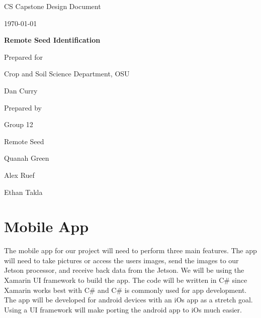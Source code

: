 \documentclass[onecolumn, draftclsnofoot,10pt, compsoc]{IEEEtran}
\def \CapstoneTeamName{		Remote Seed}
\def \CapstoneTeamNumber{		12}
\def \GroupMemberOne{			Quanah Green}
\def \GroupMemberTwo{			Alex Ruef}
\def \GroupMemberThree{			Ethan Takla}
\def \CapstoneProjectName{		Remote Seed Identification}
\def \CapstoneSponsorCompany{	Crop and Soil Science Department, OSU}
\def \CapstoneSponsorPerson{		Dan Curry}
\def \DocType{		%
				Design Document
				}
\newcommand{\NameSigPair}[1]{\par
\makebox[2.75in][r]{#1} \hfil 	\makebox[3.25in]{\makebox[2.25in]{\hrulefill} \hfill		\makebox[.75in]{\hrulefill}}
\par\vspace{-12pt} \textit{\tiny\noindent
\makebox[2.75in]{} \hfil		\makebox[3.25in]{\makebox[2.25in][r]{Signature} \hfill	\makebox[.75in][r]{Date}}}}
\renewcommand{\NameSigPair}[1]{#1}
\begin{document}
\begin{titlepage}
    \begin{singlespace}
        \hfill 
        \par\vspace{.2in}
        \centering
        \scshape{
            \huge CS Capstone \DocType \par
            {\large\today}\par
            \vspace{.5in}
            \textbf{\Huge\CapstoneProjectName}\par
            \vfill
            {\large Prepared for}\par
            \Huge \CapstoneSponsorCompany\par
            \vspace{5pt}
            {\Large\NameSigPair{\CapstoneSponsorPerson}\par}
            {\large Prepared by }\par
            Group\CapstoneTeamNumber\par
            \CapstoneTeamName\par 
            \vspace{5pt}
            {\Large
                \NameSigPair{\GroupMemberOne}\par
                \NameSigPair{\GroupMemberTwo}\par
                \NameSigPair{\GroupMemberThree}\par
            }
            \vspace{20pt}
        }
        \begin{abstract}
        		

        \end{abstract}     
    \end{singlespace}
\end{titlepage}
\newpage
{}
\tableofcontents
\clearpage
\section{Mobile App}
	The mobile app for our project will need to perform three main features.
	The app will need to take pictures or access the users images, send the images to our Jetson processor, and receive back data from the Jetson.
	We will be using the Xamarin UI framework to build the app.
	The code will be written in C\# since Xamarin works best with C\# and C\# is commonly used for app development.
	The app will be developed for android devices with an iOs app as a stretch goal.
	Using a UI framework will make porting the android app to iOs much easier.
\end{document}
